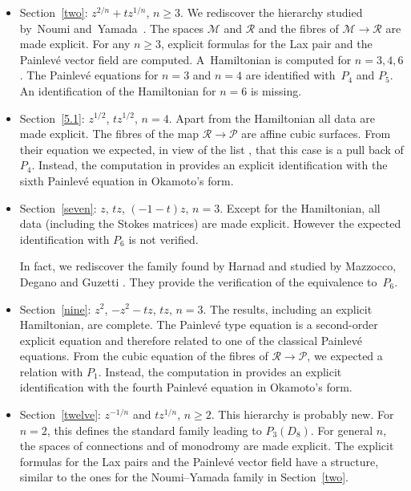 \documentclass[10pt,a4paper]{amsart}
\numberwithin{equation}{section}
\begin{document}
 \begin{itemize}\itemsep=0pt
\item Section~\ref{two}: $z^{2/n}+tz^{1/n}$, $n\geq 3$. We rediscover the hierarchy studied by~Noumi and~Yamada~\cite{N-Y}.
The spaces $\mathcal{M}$ and $\mathcal{R}$ and the fibres of $\mathcal{M}\rightarrow \mathcal{R}$ are made explicit.
For any $n\geq 3$, explicit formulas for the Lax pair and the Painlev\'e vector field are computed.
A~Hamiltonian is computed for $n=3,4,6$. The Painlev\'e equations for $n=3$ and $n=4$ are identified with~$P_4$ and $P_5$. An identification of the Hamiltonian for $n=6$ is missing.

\item Section~\ref{5.1}: $z^{1/2}$, $tz^{1/2}$, $n=4$.
Apart from the Hamiltonian all data are made explicit. The fibres of the map $\mathcal{R}\rightarrow \mathcal{P}$ are
affine cubic surfaces. From their equation we expected, in view of the list \cite[pp.~26--27]{vdP-Sa}, that this case is a
 pull back of $P_4$. Instead,
 the computation in \cite[Section~1]{Dz} provides an explicit identification with the sixth Painlev\'e equation in Okamoto's form.

\item Section~\ref{seven}: $z$, $tz$, $(-1-t)z$, $n=3$. Except for the Hamiltonian, all data (including the Stokes matrices) are made explicit. However the expected identification with $P_6$ is not verified.

In fact, we rediscover the family found by
Harnad and studied by Mazzocco, Degano and Guzetti \cite{D-G,H,Maz}. They provide the verification
of the equivalence to~$P_6$.

\item Section~\ref{nine}: $z^2$, $-z^2-tz$, $tz$, $n=3$. The results, including an explicit Hamiltonian, are complete. The
Painlev\'e type equation is a second-order explicit equation and therefore related to one of the classical Painlev\'e
equations. From the cubic equation of the fibres of $\mathcal{R}\rightarrow \mathcal{P}$, we expected a relation
with $P_1$. Instead, the computation in \cite[Section~2]{Dz} provides an explicit identification with the fourth Painlev\'e equation in Okamoto's form.

\item Section~\ref{twelve}: $z^{-1/n}$ and $tz^{1/n}$, $n\geq 2$. This hierarchy is probably new. For $n=2$, this defines the standard family leading to $P_3(D_8)$. For general $n$, the spaces of connections and of monodromy
 are made explicit. The explicit formulas for the Lax pairs and the Painlev\'e vector field have a structure,
similar to the ones for the Noumi--Yamada family in Section~\ref{two}.


\end{itemize}
\end{document}
